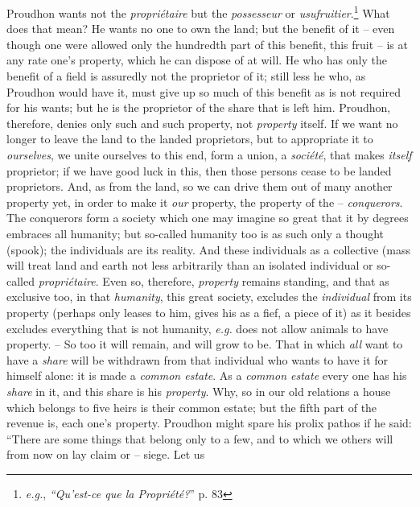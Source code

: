 \documentclass[12pt,a4paper]{book}
\begin{document}
Proudhon wants not the \textit{propri\'etaire} but the \textit{possesseur} or 
\textit{usufruitier}.\footnote{\textit{e.g.}, \textit{``Qu'est-ce que la 
Propri\'et\'e?}'' p. 83} What does that mean? He wants no one to own the 
land; but the benefit of it -- even though one were allowed only the hundredth 
part of this benefit, this fruit -- is at any rate one's property, which he 
can dispose of at will. He who has only the benefit of a field is assuredly 
not the proprietor of it; still less he who, as Proudhon would have it, must 
give up so much of this benefit as is not required for his wants; but he is 
the proprietor of the share that is left him. Proudhon, therefore, denies only 
such and such property, not \textit{property} itself. If we want no longer to 
leave the land to the landed proprietors, but to appropriate it to 
\textit{ourselves}, we unite ourselves to this end, form a union, a 
\textit{soci\'et\'e}, that makes \textit{itself} proprietor; if we have good 
luck in this, then those persons cease to be landed proprietors. And, as from 
the land, so we can drive them out of many another property yet, in order to 
make it \textit{our} property, the property of the -- \textit{conquerors}. The 
conquerors form a society which one may imagine so great that it by degrees 
embraces all humanity; but so-called humanity too is as such only a thought 
(spook); the individuals are its reality. And these individuals as a 
collective (mass will treat land and earth not less arbitrarily than an 
isolated individual or so-called \textit{propri\'etaire}. Even so, therefore, 
\textit{property} remains standing, and that as exclusive too, in that 
\textit{humanity}, this great society, excludes the \textit{individual} from 
its property (perhaps only leases to him, gives his as a fief, a piece of it) 
as it besides excludes everything that is not humanity, \textit{e.g.} does 
not allow animals to have property. -- So too it will remain, and will grow to 
be. That in which \textit{all} want to have a \textit{share} will be withdrawn 
from that individual who wants to have it for himself alone: it is made a 
\textit{common estate}. As a \textit{common estate} every one has his 
\textit{share} in it, and this share is his \textit{property}. Why, so in our 
old relations a house which belongs to five heirs is their common estate; but 
the fifth part of the revenue is, each one's property. Proudhon might spare 
his prolix pathos if he said: ``There are some things that belong only to a 
few, and to which we others will from now on lay claim or -- siege. Let us 
\end{document}
